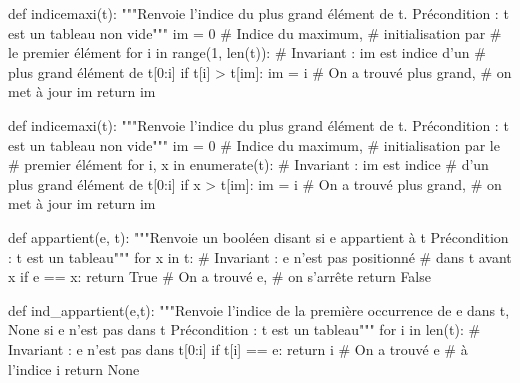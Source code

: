 \begin{multicols}{2}
\begin{pyverbatim}
def indicemaxi(t):
    """Renvoie l'indice du plus grand 
        élément de t.
       Précondition : t est un tableau 
       non vide"""
    im = 0 # Indice du maximum, 
           # initialisation par 
           # le premier élément
    for i in range(1, len(t)):
        # Invariant : im est indice d'un 
        # plus grand élément de t[0:i]
        if t[i] > t[im]:
            im = i # On a trouvé plus grand, 
                   # on met à jour im
    return im
    
\end{pyverbatim}



\begin{pyverbatim}
def indicemaxi(t):
    """Renvoie l'indice du plus grand élément 
       de t.
       Précondition : t est un tableau 
       non vide"""
    im = 0 # Indice du maximum, 
            # initialisation par le 
            # premier élément
    for i, x in enumerate(t):
        # Invariant : im est indice 
        # d'un plus grand élément de t[0:i]
        if x > t[im]:
            im = i # On a trouvé plus grand, 
                    # on met à jour im
    return im
\end{pyverbatim}



\begin{pyverbatim}
def appartient(e, t):
    """Renvoie un booléen disant si e 
    appartient à t
       Précondition : t est un tableau"""
    for x in t:
        # Invariant : e n'est pas positionné 
        # dans t avant x
        if e == x:
            return True # On a trouvé e, 
                      # on s'arrête
    return False
 
\end{pyverbatim}

\begin{pyverbatim}
def ind_appartient(e,t):
    """Renvoie l'indice de la première 
       occurrence de e dans t,
       None si e n'est pas dans t
       Précondition : t est un tableau"""
    for i in len(t):
        # Invariant : e n'est pas dans t[0:i]
        if t[i] == e:
            return i # On a trouvé e 
                   # à l'indice i
    return None
\end{pyverbatim}

\end{multicols}
